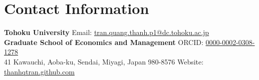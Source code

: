 \section{\sc Contact Information}
{\bf Tohoku University}     \hfill  Email: \href{mailto:tran.quang.thanh.p1@dc.tohoku.ac.jp}{tran.quang.thanh.p1@dc.tohoku.ac.jp}\\
{\bf Graduate School of Economics and Management}  	 		\hfill ORCID: \href{https://orcid.org/0000-0002-0308-1278}{0000-0002-0308-1278}\\
41 Kawauchi, Aoba-ku, Sendai, Miyagi, Japan 980-8576 \hfill Website: \href{https://thanhqtran.github.com}{thanhqtran.github.com} \\
\\


